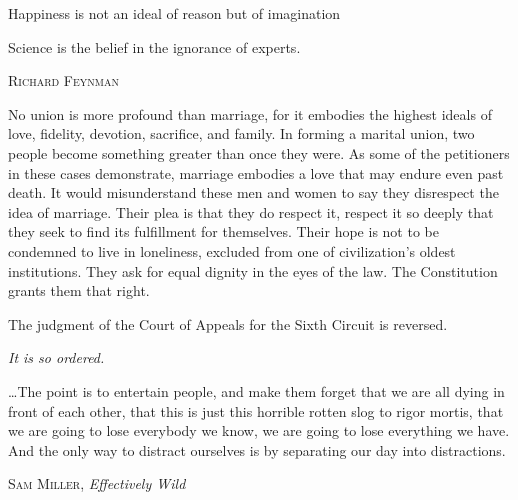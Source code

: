 \documentclass[../butidigress.tex]{subfiles}
\begin{document}
\postepi
\epigraph{Happiness is not an ideal of reason but of imagination}{}
\postepi
\epigraph{Science is the belief in the ignorance of experts.}{\textsc{Richard Feynman}}
\postepi
\epigraph{No union is more profound than marriage, for it embodies the highest ideals of love, fidelity, devotion, sacrifice, and family. In forming a marital union, two people become something greater than once they were. As some of the petitioners in these cases demonstrate, marriage embodies a love that may endure even past death. It would misunderstand these men and women to say they disrespect the idea of marriage. Their plea is that they do respect it, respect it so deeply that they seek to find its fulfillment for themselves. Their hope is not to be condemned to live in loneliness, excluded from one of civilization's oldest institutions. They ask for equal dignity in the eyes of the law. The Constitution grants them that right.\par\hspace*{2em} The judgment of the Court of Appeals for the Sixth Circuit is reversed. \par\hfill \textit{It is so ordered.}}{}
\postepi
\epigraph{\ldots The point is to entertain people, and make them forget that we are all dying in front of each other, that this is just this horrible rotten slog to rigor mortis, that we are going to lose everybody we know, we are going to lose everything we have. And the only way to distract ourselves is by separating our day into distractions.}{\textsc{Sam Miller}, \textit{Effectively Wild}}
\end{document}
